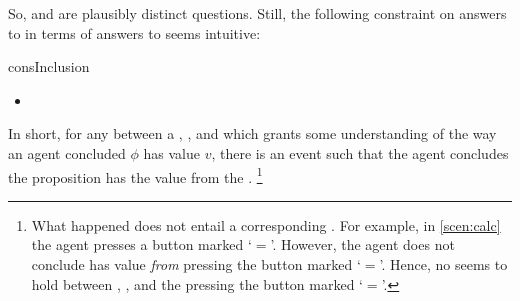 \begin{note}
  So, \qWhy{} and \qHow{} are plausibly distinct questions.
  Still, the following constraint on answers to \qWhy{} in terms of answers to \qHow{} seems intuitive:

  \begin{constraint}{consInclusion}{\issueInclusion{}}
    \mbox{ }
    \vspace{-\baselineskip}
    \begin{itemize}
    \item
  \end{itemize}
  \vspace{-\baselineskip}
  \end{constraint}

  In short, for any \ros{} between a , , and \pool{} which grants some understanding of the way an agent concluded \(\phi\) has value \(v\), there is an event such that the agent concludes the proposition has the value from the \pool{}.%
  \footnote{
    What happened does not entail a corresponding \ros{}.
  For example, in \autoref{scen:calc} the agent presses a button marked `\(=\)'.
  However, the agent does not conclude \propM{\gistCalcEq{}} has value  \emph{from} pressing the button marked `\(=\)'.
  Hence, no \ros{} seems to hold between \propM{\gistCalcEq{}}, , and the pressing the button marked `\(=\)'.
  }
\end{note}

